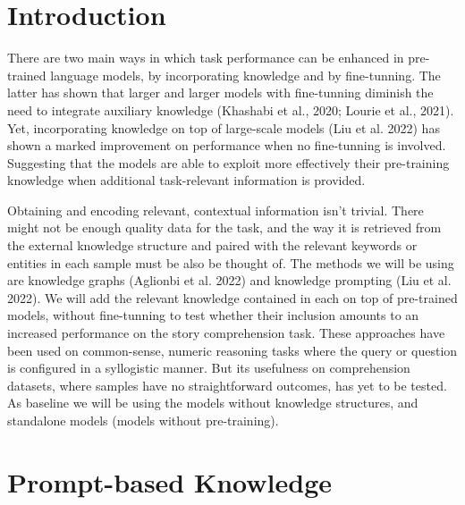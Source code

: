 \documentclass{article}
\begin{document}
\begin{multicols}{2}
\section{Introduction}
There are two main ways in which task performance can be enhanced in pre-trained language models, by incorporating knowledge and by fine-tunning. The latter has shown that larger and larger models with fine-tunning diminish the need to integrate auxiliary knowledge (Khashabi et al., 2020; Lourie et al., 2021). Yet, incorporating knowledge on top of large-scale models (Liu et al. 2022) has shown a marked improvement on performance when no fine-tunning is involved. Suggesting that the models are able to exploit more effectively their pre-training knowledge when additional task-relevant information is provided. 

Obtaining and encoding relevant, contextual information isn't trivial. There might not be enough quality data for the task, and the way it is retrieved from the external knowledge structure and paired with the relevant keywords or entities in each sample must be also be thought of. 
The methods we will be using are knowledge graphs (Aglionbi et al. 2022) and knowledge prompting (Liu et al. 2022). We will add the relevant knowledge contained in each on top of pre-trained models, without fine-tunning to test whether their inclusion amounts to an increased performance on the story comprehension task. These approaches have been used on common-sense, numeric reasoning tasks where the query or question is configured in a syllogistic manner. But its usefulness on comprehension datasets, where samples have no straightforward outcomes, has yet to be tested. As baseline we will be using the models without knowledge structures, and standalone models (models without pre-training). 

\section{Prompt-based Knowledge}
\lipsum[3-4]


\end{multicols}
\end{document}
